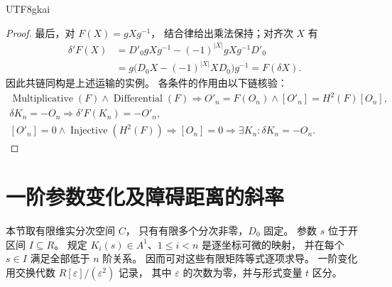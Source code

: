 \documentclass[12pt,a4paper,openany,notitlepage]{report}
\theoremstyle{plain}
\theoremstyle{definition}
\theoremstyle{remark}
\def\mathcal#1{#1}\def\mathsf#1{#1}\def\mathbb#1{#1}%
\begin{document}
\begin{CJK*}{UTF8}{gkai}
\begin{proof}
最后，对 $F(X)=gXg^{-1}$，
结合律给出乘法保持；对齐次 $X$ 有
\[
 \begin{aligned}
 \delta'F(X)
 &=D'_0gXg^{-1}-(-1)^{|X|}gXg^{-1}D'_0\\
 &=g\bigl(D_0X-(-1)^{|X|}XD_0\bigr)g^{-1}
 =F(\delta X).
 \end{aligned}
\]
因此共链同构是上述运输的实例。
各条件的作用由以下链核验：
\[
 \begin{gathered}
 \operatorname{Multiplicative}(F)\land
 \operatorname{Differential}(F)
 \Rightarrow O'_n=F(O_n)
 \land[O'_n]=H^2(F)[O_n],\\
 \delta K_n=-O_n
 \Rightarrow\delta'F(K_n)=-O'_n,\\
 [O'_n]=0\land\operatorname{Injective}(H^2(F))
 \Rightarrow[O_n]=0
 \Rightarrow\exists K_n:\delta K_n=-O_n.
 \end{gathered}
\]
\end{proof}

\section{一阶参数变化及障碍距离的斜率}
\label{exp:hom:obstruction-slope}

本节取有限维实分次空间 $C$，
只有有限多个分次非零，$D_0$ 固定。
参数 $s$ 位于开区间 $I\subseteq\mathbb R$。
规定 $K_i(s)\in\mathcal A^1$、$1\le i<n$ 是逐坐标可微的映射，
并在每个 $s\in I$ 满足全部低于 $n$ 阶关系。
因而可对这些有限矩阵等式逐项求导。
一阶变化用交换代数 $\mathbb R[\varepsilon]/(\varepsilon^2)$ 记录，
其中 $\varepsilon$ 的次数为零，并与形式变量 $t$ 区分。


\end{CJK*}
\end{document}
